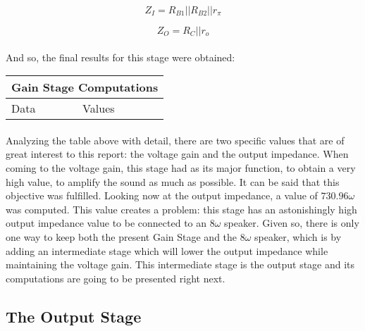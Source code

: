 \begin{equation}
    Z_I=R_{B1}||R_{B2}||r_\pi
\end{equation}

\begin{equation}
    Z_O=R_C||r_o
\end{equation}


\paragraph{}And so, the final results for this stage were obtained:

\begin{table}[H]
\centering
\begin{tabular}{|l|l|} 
\hline
\multicolumn{2}{|l|}{\textbf{Gain Stage Computations}}  \\ 
\hline
Data             & Values                               \\ 
\hline
        
\end{tabular}
\end{table}

\paragraph{}Analyzing the table above with detail, there are two specific values that are of great interest to this report: the voltage gain and the output impedance. When coming to the voltage gain, this stage had as its major function, to obtain a very high value, to amplify the sound as much as possible. It can be said that this objective was fulfilled. Looking now at the output impedance, a value of  $730.96 \omega$ was computed. This value creates a problem: this stage has an astonishingly high output impedance value to be connected to an $8 \omega$ speaker. Given so, there is only one way to keep both the present Gain Stage and the $8 \omega$ speaker, which is by adding an intermediate stage which will lower the output impedance while maintaining the voltage gain. This intermediate stage is the output stage and its computations are going to be presented right next. 





\subsection{The Output Stage}

